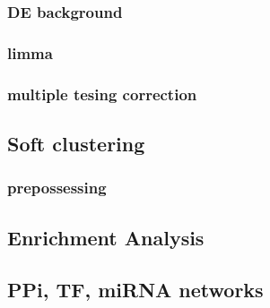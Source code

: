         \subsubsection{DE background}
        \subsubsection{limma}
        \subsubsection{multiple tesing correction}

    \subsection{Soft clustering}
        \subsubsection{prepossessing}
    
    \subsection{Enrichment Analysis}
    
    \subsection{PPi, TF, miRNA networks}